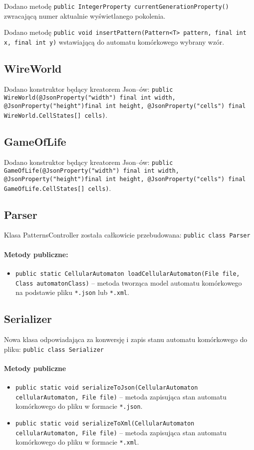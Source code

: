 \documentclass{mwart}
\begin{document}
Dodano metodę \texttt{public IntegerProperty currentGenerationProperty()} zwracającą numer aktualnie wyświetlanego pokolenia.

Dodano metodę \texttt{public void insertPattern(Pattern<T> pattern, final int x, final int y)} wstawiającą do automatu komórkowego wybrany wzór.

\subsection{WireWorld}
Dodano konstruktor będący kreatorem Json--ów: \texttt{public WireWorld(@JsonProperty("width") final int  width, @JsonProperty("height")final int height, @JsonProperty("cells") final WireWorld.CellStates[] cells)}.

\subsection{GameOfLife}
Dodano konstruktor będący kreatorem Json--ów: \texttt{public GameOfLife(@JsonProperty("width") final int  width, @JsonProperty("height")final int height, @JsonProperty("cells") final GameOfLife.CellStates[] cells)}.

\subsection{Parser}
Klasa PatternsController została całkowicie przebudowana:
\texttt{public class Parser}

\paragraph{Metody publiczne:}
\begin{itemize}
	\item \texttt{public static CellularAutomaton loadCellularAutomaton(File file, Class automatonClass)} -- metoda tworząca model automatu komórkowego na podstawie pliku \texttt{*.json} lub \texttt{*.xml}.
\end{itemize}

\subsection{Serializer}
Nowa klasa odpowiadająca za konwersję i zapis stanu automatu komórkowego do pliku:
\texttt{public class Serializer}
\paragraph{Metody publiczne}
\begin{itemize}
	\item \texttt{public static void serializeToJson(CellularAutomaton cellularAutomaton, File file)} -- metoda zapisująca stan automatu komórkowego do pliku w formacie \texttt{*.json}.
	\item \texttt{public static void serializeToXml(CellularAutomaton cellularAutomaton, File file)} -- metoda zapisująca stan automatu komórkowego do pliku w formacie \texttt{*.xml}.
\end{itemize}
\end{document}
